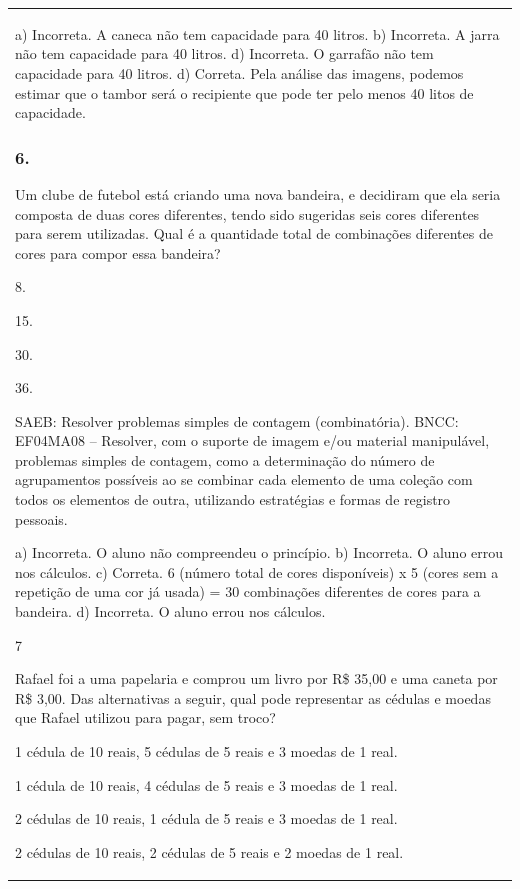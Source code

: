 \begin{mdframed}[linewidth=2pt,linecolor=salmao,roundcorner=2pt]
\begin{escolha}
{{{\begin{longtable}[]{@{}l@{}}
\begin{itemize}
{a) Incorreta. A caneca não tem capacidade para 40 litros.
b) Incorreta. A jarra não tem capacidade para 40 litros.
d) Incorreta. O garrafão não tem capacidade para 40 litros.
d) Correta. Pela análise das imagens, podemos estimar que o tambor será o recipiente que
pode ter pelo menos 40 litos de capacidade.

\subsubsection{6. }

Um clube de futebol está criando uma nova bandeira, e decidiram que ela seria composta de duas cores diferentes, tendo sido sugeridas seis cores
diferentes para serem utilizadas. Qual é a quantidade total de combinações
diferentes de cores para compor essa bandeira?

\begin{escolha}
\item
  8.
\item
  15.
\item
  30.
\item
  36.
\end{escolha}

SAEB: Resolver problemas simples de contagem (combinatória).
BNCC: EF04MA08 -- Resolver, com o suporte de imagem e/ou material manipulável, problemas simples
de contagem, como a determinação do número de agrupamentos possíveis ao se combinar cada
elemento de uma coleção com todos os elementos de outra, utilizando estratégias e formas de
registro pessoais.

a) Incorreta. O aluno não compreendeu o princípio.
b) Incorreta. O aluno errou nos cálculos.
c) Correta. 6 (número total de cores disponíveis) x 5 (cores sem a repetição de uma cor já usada) = 30 combinações diferentes de cores para a bandeira.
d) Incorreta. O aluno errou nos cálculos.

\num{7}

Rafael foi a uma papelaria e comprou um livro por R\$ 35,00 e uma caneta
por R\$ 3,00. Das alternativas a seguir, qual pode representar as cédulas
e moedas que Rafael utilizou para pagar, sem troco?

\begin{escolha}
\item
  1 cédula de 10 reais, 5 cédulas de 5 reais e 3 moedas de 1 real.
\item
  1 cédula de 10 reais, 4 cédulas de 5 reais e 3 moedas de 1 real.
\item
  2 cédulas de 10 reais, 1 cédula de 5 reais e 3 moedas de 1 real.
\item
  2 cédulas de 10 reais, 2 cédulas de 5 reais e 2 moedas de 1 real.
\end{escolha}

}
\end{itemize}
\end{longtable}}}}
\end{escolha}
\end{mdframed}
